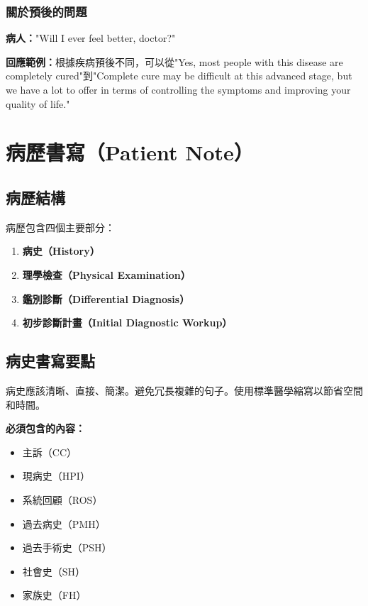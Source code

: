 \documentclass[12pt,a4paper]{article}
\newcommand{\note}[1]{
    \par
    \noindent
    \begin{tcolorbox}[
        colback=emergency_blue!5!white,
        colframe=emergency_blue,
        title=\textbf{重點提醒},
        fonttitle=\bfseries,
        boxrule=0.5pt,
        arc=3pt,
        left=6pt,
        right=6pt,
        top=6pt,
        bottom=6pt
    ]
    #1
    \end{tcolorbox}
}
\begin{document}
\subsubsection{關於預後的問題}

\begin{tcolorbox}[colback=highlight_yellow,colframe=emergency_gray]
\textbf{病人：}"Will I ever feel better, doctor?"

\textbf{回應範例：}根據疾病預後不同，可以從"Yes, most people with this disease are completely cured"到"Complete cure may be difficult at this advanced stage, but we have a lot to offer in terms of controlling the symptoms and improving your quality of life."
\end{tcolorbox}

\section{病歷書寫（Patient Note）}

\subsection{病歷結構}

病歷包含四個主要部分：

\begin{enumerate}
    \item \textbf{病史（History）}
    \item \textbf{理學檢查（Physical Examination）}
    \item \textbf{鑑別診斷（Differential Diagnosis）}
    \item \textbf{初步診斷計畫（Initial Diagnostic Workup）}
\end{enumerate}

\subsection{病史書寫要點}

\note{病史應該清晰、直接、簡潔。避免冗長複雜的句子。使用標準醫學縮寫以節省空間和時間。}

\textbf{必須包含的內容：}
\begin{itemize}
    \item 主訴（CC）
    \item 現病史（HPI）
    \item 系統回顧（ROS）
    \item 過去病史（PMH）
    \item 過去手術史（PSH）
    \item 社會史（SH）
    \item 家族史（FH）
\end{itemize}
\end{document}
